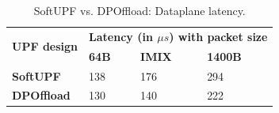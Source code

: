 \begin{table}[t]
\begin{scriptsize}
\begin{center}
\def\arraystretch{1.5}%
\begin{tabular}{|p{1.8cm}|p{0.8cm}|p{0.8cm}|p{0.8cm}|}\hline 
 \multirow{2}{*}{\bf{UPF design}} &   \multicolumn{3}{c|}{\bf{Latency (in $\mu s$) with packet size}}  \\ %
 & {\bf{64B}} & {\bf{IMIX}} & {\bf{1400B}} \\ \hline 
{\bf{SoftUPF}} & 138  & 176  & 294  \\ \hline
{\bf{DPOffload}}  & 130  & 140  & 222  \\ \hline
\end{tabular}
\setlength{\abovecaptionskip}{-8pt}
\setlength{\belowcaptionskip}{8pt}
\caption{SoftUPF vs. DPOffload: Dataplane latency.} 
\vspace{-1mm}
\label{tab:AvsC_latency}
\end{center}
\end{scriptsize}
\end{table}

